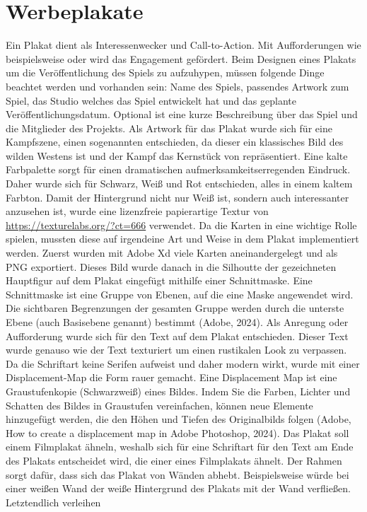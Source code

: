 
\section{Werbeplakate}\label{sec:trailer}

\renewcommand{\kapitelautor}{Autor: Markus Böheim}

Ein Plakat dient als Interessenwecker und Call-to-Action. Mit Aufforderungen wie beispielsweise
 oder  wird das Engagement gefördert.
Beim Designen eines Plakats um die Veröffentlichung des Spiels zu aufzuhypen, müssen folgende Dinge beachtet werden und vorhanden sein: Name des Spiels, passendes Artwork zum Spiel, das Studio welches das Spiel entwickelt hat und das geplante Veröffentlichungsdatum. Optional ist eine kurze Beschreibung über das Spiel und die Mitglieder des Projekts.
Als Artwork für das Plakat wurde sich für eine Kampfszene, einen sogenannten  entschieden, da dieser ein klassisches Bild des wilden Westens ist und der Kampf das Kernstück von \FF repräsentiert. Eine kalte Farbpalette sorgt für einen dramatischen aufmerksamkeitserregenden Eindruck. Daher wurde sich für Schwarz, Weiß und Rot entschieden, alles in einem kaltem Farbton. Damit der Hintergrund nicht nur Weiß ist, sondern auch interessanter anzusehen ist, wurde eine lizenzfreie papierartige Textur von \url{https://texturelabs.org/?ct=666} verwendet. Da die Karten in \FF eine wichtige Rolle spielen, mussten diese auf irgendeine Art und Weise in dem Plakat implementiert werden. Zuerst wurden mit Adobe Xd viele Karten aneinandergelegt und als PNG exportiert. Dieses Bild wurde danach in die Silhoutte der gezeichneten Hauptfigur auf dem Plakat eingefügt mithilfe einer Schnittmaske. Eine Schnittmaske ist eine Gruppe von Ebenen, auf die eine Maske angewendet wird. Die sichtbaren Begrenzungen der gesamten Gruppe werden durch die unterste Ebene (auch Basisebene genannt) bestimmt (Adobe, 2024). Als Anregung oder Aufforderung wurde sich für den Text
 auf dem Plakat entschieden. Dieser Text wurde genauso wie der Text
 texturiert um einen rustikalen Look zu verpassen. Da die Schriftart keine Serifen aufweist und daher modern wirkt, wurde mit einer Displacement-Map die Form rauer gemacht. Eine Displacement Map ist eine Graustufenkopie (Schwarzweiß) eines Bildes. Indem Sie die Farben, Lichter und Schatten des Bildes in Graustufen vereinfachen, können neue Elemente hinzugefügt werden, die den Höhen und Tiefen des Originalbilds folgen (Adobe, How to create a displacement map in Adobe Photoshop, 2024). Das Plakat soll einem Filmplakat ähneln, weshalb sich für eine Schriftart für den Text am Ende des Plakats entscheidet wird, die einer eines Filmplakats ähnelt. Der Rahmen sorgt dafür, dass sich das Plakat von Wänden abhebt. Beispielsweise würde bei einer weißen Wand der weiße Hintergrund des Plakats mit der Wand verfließen. Letztendlich verleihen
